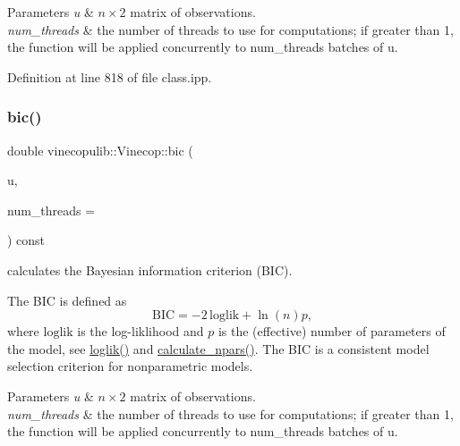 \begin{DoxyParams}{Parameters}
{\em u} & $n \times 2$ matrix of observations. \\
\hline
{\em num\+\_\+threads} & the number of threads to use for computations; if greater than 1, the function will be applied concurrently to {\ttfamily num\+\_\+threads} batches of {\ttfamily u}. \\
\hline
\end{DoxyParams}


Definition at line 818 of file class.\+ipp.

\mbox{\label{classvinecopulib_1_1_vinecop_a61745ef0b908f6580a5af8fb40221869}} 
\subsubsection{\texorpdfstring{bic()}{bic()}}
{\footnotesize\ttfamily double vinecopulib\+::\+Vinecop\+::bic (\begin{DoxyParamCaption}\item[{const Eigen\+::\+Matrix\+Xd \&}]{u,  }\item[{const size\+\_\+t}]{num\+\_\+threads = {} }\end{DoxyParamCaption}) const\hspace{0.3cm}{\ttfamily [inline]}}



calculates the Bayesian information criterion (B\+IC). 

The B\+IC is defined as \[ \mathrm{BIC} = -2\, \mathrm{loglik} + \ln(n) p, \] where $ \mathrm{loglik} $ is the log-\/liklihood and $ p $ is the (effective) number of parameters of the model, see \hyperlink{classvinecopulib_1_1_vinecop_a07e9c59b42d0668df5fc5e69b281272e}{loglik()} and \hyperlink{classvinecopulib_1_1_vinecop_a2b4b1151c5b0a817811628aa59de7eea}{calculate\+\_\+npars()}. The B\+IC is a consistent model selection criterion for nonparametric models.


\begin{DoxyParams}{Parameters}
{\em u} & $n \times 2$ matrix of observations. \\
\hline
{\em num\+\_\+threads} & the number of threads to use for computations; if greater than 1, the function will be applied concurrently to {\ttfamily num\+\_\+threads} batches of {\ttfamily u}. \\
\hline
\end{DoxyParams}


